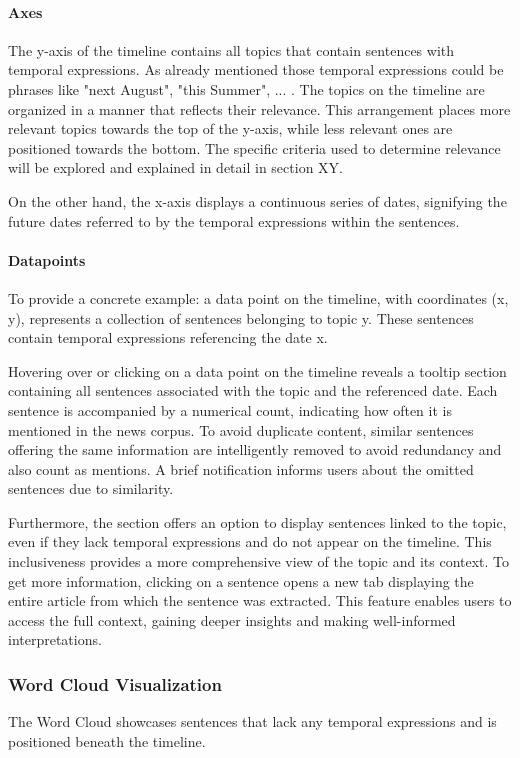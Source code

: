 \documentclass[a4paper,10pt]{report} %
\begin{document}
\paragraph{Axes}
The y-axis of the timeline contains all topics that contain sentences with temporal expressions. As already mentioned those temporal expressions could be phrases like "next August", "this Summer", ... . The topics on the timeline are organized in a manner that reflects their relevance. This arrangement places more relevant topics towards the top of the y-axis, while less relevant ones are positioned towards the bottom. The specific criteria used to determine relevance will be explored and explained in detail in section XY.

On the other hand, the x-axis displays a continuous series of dates, signifying the future dates referred to by the temporal expressions within the sentences.

\paragraph{Datapoints}
To provide a concrete example: a data point on the timeline, with coordinates (x, y), represents a collection of sentences belonging to topic y. These sentences contain temporal expressions referencing the date x.

Hovering over or clicking on a data point on the timeline reveals a tooltip section containing all sentences associated with the topic and the referenced date. Each sentence is accompanied by a numerical count, indicating how often it is mentioned in the news corpus. To avoid duplicate content, similar sentences offering the same information are intelligently removed to avoid redundancy and also count as mentions. A brief notification informs users about the omitted sentences due to similarity.

Furthermore, the section offers an option to display sentences linked to the topic, even if they lack temporal expressions and do not appear on the timeline. This inclusiveness provides a more comprehensive view of the topic and its context. To get more information, clicking on a sentence opens a new tab displaying the entire article from which the sentence was extracted. This feature enables users to access the full context, gaining deeper insights and making well-informed interpretations.

\subsubsection{Word Cloud Visualization}
The Word Cloud showcases sentences that lack any temporal expressions and is positioned beneath the timeline.
\end{document}
